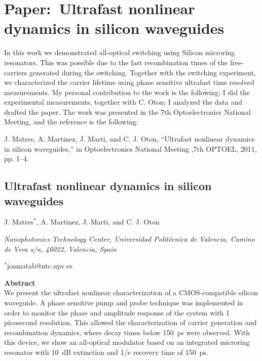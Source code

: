 \chapter{Paper:~Ultrafast nonlinear dynamics in silicon waveguides}
\label{ch:paperSwitching}

In this work we demonstrated all-optical switching using Silicon microring resonators. 
This was possible due to the fast recombination times of the free-carriers generated during the switching.
Together with the switching experiment, we characterized the carrier lifetime using  phase sensitive ultrafast time resolved measurements.
My personal contribution to the work is the following: I did the experimental measurements, together with C. Oton; I analyzed the data and drafted the paper.
The work was presented in the 7th Optoelectronics National Meeting, and the reference is the following:



\vspace{1.5cm}
J. Matres, A. Martinez, J. Marti, and C. J. Oton, “Ultrafast nonlinear dynamics in silicon waveguides,” in Optoelectronics National Meeting ,7th OPTOEL, 2011, pp. 1–4.


\newpage
\begin{center}
\section*{Ultrafast nonlinear dynamics in silicon waveguides}
{J. Matres$^*$, A. Martinez, J. Marti, and C. J. Oton} 
\end{center}

\noindent
\textit{Nanophotonics Technology Center, Universidad Polit\'ecnica de Valencia, Camino de Vera s/n, 46022, Valencia, Spain}

\begin{center}
{$^*$joamatab@ntc.upv.es}
\end{center}


\textbf{Abstract} \\
\noindent
We present the ultrafast nonlinear characterization of a CMOS-compatible silicon waveguide. A phase sensitive pump and probe technique was implemented in order to monitor the phase and amplitude response of the system with 1 picosecond resolution. This allowed the characterization of carrier generation and recombination dynamics, where decay times below 150~ps were observed. With this device, we show an all-optical modulator based on an integrated microring resonator with 10~dB extinction and 1/e recovery time of 150~ps.



